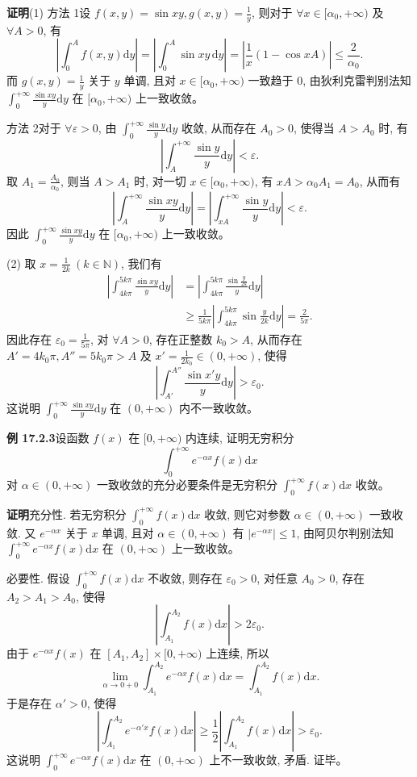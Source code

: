 \documentclass[UTF8, 12pt, fontset=fandol, oneside]{ctexart}
\begin{document}
\noindent\textbf{证明}\quad (1) 方法 1\quad 设 $f(x,y)=\sin xy,g(x,y)=\frac1y$, 则对于 $\forall x\in[\alpha_0,+\infty)$ 及 $\forall A>0$, 有
\[
  \left|\int_0^A f(x,y)\mathrm dy\right|
  =
  \left|\int_0^A\sin xy\,\mathrm dy\right|
  =
  \left|\frac1x(1-\cos xA)\right|
  \leqslant\frac2{\alpha_0}.
\]
而 $g(x,y)=\frac1y$ 关于 $y$ 单调, 且对 $x\in[\alpha_0,+\infty)$ 一致趋于 $0$, 由狄利克雷判别法知 $\int_0^{+\infty}\frac{\sin xy}{y}\mathrm dy$ 在 $[\alpha_0,+\infty)$ 上一致收敛。

方法 2\quad 对于 $\forall\varepsilon>0$, 由 $\int_0^{+\infty}\frac{\sin y}{y}\mathrm dy$ 收敛, 从而存在 $A_0>0$, 使得当 $A>A_0$ 时, 有
\[
  \left|\int_A^{+\infty}\frac{\sin y}{y}\mathrm dy\right|<\varepsilon.
\]
取 $A_1=\frac{A_0}{\alpha_0}$, 则当 $A>A_1$ 时, 对一切 $x\in[\alpha_0,+\infty)$, 有 $xA>\alpha_0 A_1=A_0$, 从而有
\[
  \left|\int_A^{+\infty}\frac{\sin xy}{y}\mathrm dy\right|
  =
  \left|\int_{xA}^{+\infty}\frac{\sin y}{y}\mathrm dy\right|
  <\varepsilon.
\]
因此 $\int_0^{+\infty}\frac{\sin xy}{y}\mathrm dy$ 在 $[\alpha_0,+\infty)$ 上一致收敛。

(2) 取 $x=\frac1{2k}\ (k\in\mathbb N)$, 我们有
\[
\begin{aligned}
  \left|\int_{4k\pi}^{5k\pi}\frac{\sin xy}{y}\mathrm dy\right|
  &=\left|\int_{4k\pi}^{5k\pi}\frac{\sin\frac{y}{2k}}{y}\mathrm dy\right|\\
  &\geqslant \frac1{5k\pi}\left|\int_{4k\pi}^{5k\pi}\sin\frac{y}{2k}\mathrm dy\right|
  =\frac2{5\pi}.
\end{aligned}
\]
因此存在 $\varepsilon_0=\frac1{5\pi}$, 对 $\forall A>0$, 存在正整数 $k_0>A$, 从而存在 $A'=4k_0\pi,A''=5k_0\pi>A$ 及 $x'=\frac1{2k_0}\in(0,+\infty)$, 使得
\[
  \left|\int_{A'}^{A''}\frac{\sin x'y}{y}\mathrm dy\right|>\varepsilon_0.
\]
这说明 $\int_0^{+\infty}\frac{\sin xy}{y}\mathrm dy$ 在 $(0,+\infty)$ 内不一致收敛。

\noindent\textbf{例 17.2.3}\quad 设函数 $f(x)$ 在 $[0,+\infty)$ 内连续, 证明无穷积分
\[
  \int_0^{+\infty}e^{-\alpha x}f(x)\mathrm dx
\]
对 $\alpha\in(0,+\infty)$ 一致收敛的充分必要条件是无穷积分 $\int_0^{+\infty}f(x)\mathrm dx$ 收敛。

\noindent\textbf{证明}\quad 充分性. 若无穷积分 $\int_0^{+\infty}f(x)\mathrm dx$ 收敛, 则它对参数 $\alpha\in(0,+\infty)$ 一致收敛. 又 $e^{-\alpha x}$ 关于 $x$ 单调, 且对 $\alpha\in(0,+\infty)$ 有 $|e^{-\alpha x}|\leqslant1$, 由阿贝尔判别法知 $\int_0^{+\infty}e^{-\alpha x}f(x)\mathrm dx$ 在 $(0,+\infty)$ 上一致收敛。

必要性. 假设 $\int_0^{+\infty}f(x)\mathrm dx$ 不收敛, 则存在 $\varepsilon_0>0$, 对任意 $A_0>0$, 存在 $A_2>A_1>A_0$, 使得
\[
  \left|\int_{A_1}^{A_2}f(x)\mathrm dx\right|>2\varepsilon_0.
\]
由于 $e^{-\alpha x}f(x)$ 在 $[A_1,A_2]\times[0,+\infty)$ 上连续, 所以
\[
  \lim_{\alpha\to0+0}\int_{A_1}^{A_2}e^{-\alpha x}f(x)\mathrm dx
  =\int_{A_1}^{A_2}f(x)\mathrm dx.
\]
于是存在 $\alpha'>0$, 使得
\[
  \left|\int_{A_1}^{A_2}e^{-\alpha'x}f(x)\mathrm dx\right|
  \geqslant \frac12\left|\int_{A_1}^{A_2}f(x)\mathrm dx\right|
  >\varepsilon_0.
\]
这说明 $\int_0^{+\infty}e^{-\alpha x}f(x)\mathrm dx$ 在 $(0,+\infty)$ 上不一致收敛, 矛盾. 证毕。
\end{document}
